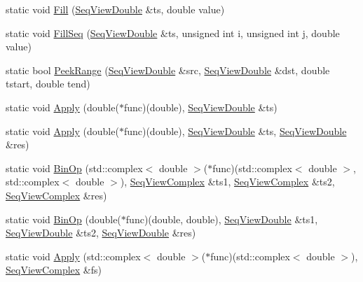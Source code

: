 \begin{Indent}
\begin{DoxyCompactItemize}
\item 
static void \hyperlink{classtsa_1_1_view_util_a82cc2f70f00bab7f0a9a39de47f24ce5}{Fill} (\hyperlink{namespacetsa_ac599574bcc094eda25613724b8f3ca9e}{Seq\+View\+Double} \&ts, double value)
\item 
static void \hyperlink{classtsa_1_1_view_util_a7f0e2c3c9c8acbfc6f6e04182f6b126c}{Fill\+Seq} (\hyperlink{namespacetsa_ac599574bcc094eda25613724b8f3ca9e}{Seq\+View\+Double} \&ts, unsigned int i, unsigned int j, double value)
\item 
static bool \hyperlink{classtsa_1_1_view_util_a6b5c89f0dee5e5c4f28243bf9cd7cc6d}{Peek\+Range} (\hyperlink{namespacetsa_ac599574bcc094eda25613724b8f3ca9e}{Seq\+View\+Double} \&src, \hyperlink{namespacetsa_ac599574bcc094eda25613724b8f3ca9e}{Seq\+View\+Double} \&dst, double tstart, double tend)
\item 
static void \hyperlink{classtsa_1_1_view_util_afeeb25836288a1f484cb2ea6968b19dc}{Apply} (double($\ast$func)(double), \hyperlink{namespacetsa_ac599574bcc094eda25613724b8f3ca9e}{Seq\+View\+Double} \&ts)
\item 
static void \hyperlink{classtsa_1_1_view_util_a23f737c5807ed1972d1855e02008bc68}{Apply} (double($\ast$func)(double), \hyperlink{namespacetsa_ac599574bcc094eda25613724b8f3ca9e}{Seq\+View\+Double} \&ts, \hyperlink{namespacetsa_ac599574bcc094eda25613724b8f3ca9e}{Seq\+View\+Double} \&res)
\item 
static void \hyperlink{classtsa_1_1_view_util_ab0581113b72809931eecd046aade4bba}{Bin\+Op} (std\+::complex$<$ double $>$($\ast$func)(std\+::complex$<$ double $>$, std\+::complex$<$ double $>$), \hyperlink{namespacetsa_ab32775c889b53c40fa83939f22372b75}{Seq\+View\+Complex} \&ts1, \hyperlink{namespacetsa_ab32775c889b53c40fa83939f22372b75}{Seq\+View\+Complex} \&ts2, \hyperlink{namespacetsa_ab32775c889b53c40fa83939f22372b75}{Seq\+View\+Complex} \&res)
\item 
static void \hyperlink{classtsa_1_1_view_util_af8b92069d5fa30c169f4dcb34e675972}{Bin\+Op} (double($\ast$func)(double, double), \hyperlink{namespacetsa_ac599574bcc094eda25613724b8f3ca9e}{Seq\+View\+Double} \&ts1, \hyperlink{namespacetsa_ac599574bcc094eda25613724b8f3ca9e}{Seq\+View\+Double} \&ts2, \hyperlink{namespacetsa_ac599574bcc094eda25613724b8f3ca9e}{Seq\+View\+Double} \&res)
\item 
static void \hyperlink{classtsa_1_1_view_util_ad0b99f095c828395b1637da1d60564a4}{Apply} (std\+::complex$<$ double $>$($\ast$func)(std\+::complex$<$ double $>$), \hyperlink{namespacetsa_ab32775c889b53c40fa83939f22372b75}{Seq\+View\+Complex} \&fs)

\end{DoxyCompactItemize}
\end{Indent}

